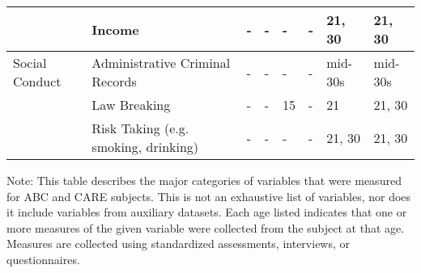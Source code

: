 \begin{sidewaystable}
{\begin{tabular*}{\textwidth}{L{2cm} C{3.5cm} C{2.8cm} C{2.8cm} C{2.5cm}  C{2.5cm} C{2cm} C{2cm}}
 & Income & - & - & - & - & 21, 30 & 21, 30 \\
 \midrule
Social Conduct & Administrative Criminal Records & - & - & - & - & mid-30s & mid-30s \\
& Law Breaking & - & - & 15 & - & 21 & 21, 30 \\
 & Risk Taking (e.g. smoking, drinking) & - & - & - & - & 21, 30 & 21, 30 \\
\toprule
\end{tabular*}}
\begin{tablenotes}
\item Note: This table describes the major categories of variables that were measured for ABC and CARE subjects. This is not an exhaustive list of variables, nor does it include variables from auxiliary datasets. Each age listed indicates that one or more measures of the given variable were collected from the subject at that age. Measures are collected using standardized assessments, interviews, or questionnaires. 
\end{tablenotes}
\end{sidewaystable}